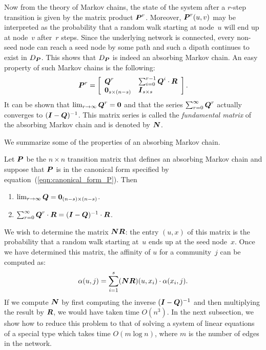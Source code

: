 Now from the theory of Markov chains, the state of the system after a $r$-step transition 
is given by the matrix product $\boldsymbol{P}^r$. Moreover, $\boldsymbol{P}^r (u, v)$ may be interpreted 
as the probability that a random walk starting at node~$u$ will end up at node~$v$ 
after~$r$ steps. Since the underlying network is connected, every non-seed node can reach a seed
node by some path and such a dipath continues to exist in $D_{\boldsymbol{P}}$. This shows that $D_{\boldsymbol{P}}$
is indeed an absorbing Markov chain. An easy property of such Markov chains is the following:
\begin{equation}\label{exp:rth_product_of_P}
	\boldsymbol{P}^r = \left [ \begin{array}{ll}
						\boldsymbol{Q}^r  					& \sum_{i = 0}^{r - 1}\boldsymbol{Q}^i \cdot \boldsymbol{R} \\
						 \boldsymbol{0}_{s \times (n - s)} & \boldsymbol{I}_{s \times s}
						\end{array}
				\right ].
\end{equation}  
It can be shown that $\lim_{r \to \infty} \boldsymbol{Q}^{r} = \boldsymbol{0}$ and that 
the series $\sum_{r = 0}^{\infty} \boldsymbol{Q}^{r}$ actually converges to 
$(\boldsymbol{I} - \boldsymbol{Q})^{-1}$. This matrix series is called the \emph{fundamental matrix}
of the absorbing Markov chain and is denoted by $\boldsymbol{N}$. 

We summarize some of the properties of an absorbing Markov chain. 
\begin{proposition}\label{prop:limiting_Q}
	Let $\boldsymbol{P}$ be the $n \times n$ transition matrix that defines an absorbing Markov chain
	and suppose that $\boldsymbol{P}$ is in the canonical form specified by equation~(\ref{eqn:canonical_form_P}). 
	Then
	\begin{enumerate}
		\item $\lim_{r \to \infty} \boldsymbol{Q} = \boldsymbol{0}_{(n - s) \times (n - s)}$.
		\item $\sum_{r = 0}^{\infty} \boldsymbol{Q}^r \cdot \boldsymbol{R} = (\boldsymbol{I} - \boldsymbol{Q})^{-1} \cdot \boldsymbol{R}$.
	\end{enumerate} 
\end{proposition}

We wish to determine the matrix $\boldsymbol{N} \boldsymbol{R}$: the entry $(u, x)$ of this 
matrix is the probability that a random walk starting at~$u$ ends up at the seed 
node~$x$. Once we have determined this matrix, the affinity of $u$ for 
a community~$j$ can be computed as:
\begin{equation}\label{eqn:belonging_vector}
	\alpha (u, j) = \sum_{i = 1}^{s} (\boldsymbol{N} \boldsymbol{R}) (u, x_i) \cdot \alpha (x_i, j).
\end{equation}
If we compute $\boldsymbol{N}$ by first computing the inverse $(\boldsymbol{I} - \boldsymbol{Q})^{-1}$
and then multiplying the result by $\boldsymbol{R}$, we would have taken time $O(n^3)$. In the 
next subsection, we show how to reduce this problem to that of solving a 
system of linear equations of a special type which takes time $O(m \log n)$, where $m$
is the number of edges in the network.

